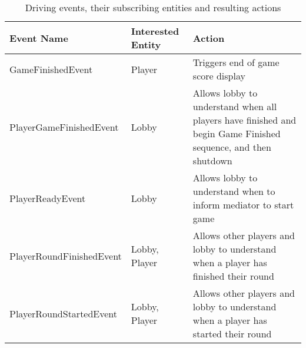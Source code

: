 \begin{table}[H]
	\centering
	\begin{tabular}{ | l | l | p{10cm} | }
		\hline
		Event Name & Interested Entity & Action  \\
		\hline
		\hline
		GameFinishedEvent & Player & Triggers end of game score display\\ 
		\hline
		PlayerGameFinishedEvent & Lobby & Allows lobby to understand when all players have finished and begin Game Finished sequence, and then shutdown \\
		\hline
		PlayerReadyEvent & Lobby & Allows lobby to understand when to inform mediator to start game \\
		\hline
		PlayerRoundFinishedEvent & Lobby, Player & Allows other players and lobby to understand when a player has finished their round \\
		\hline
		PlayerRoundStartedEvent & Lobby, Player & Allows other players and lobby to understand when a player has started their round \\
		\hline
	\end{tabular}
	\caption{Driving events, their subscribing entities and resulting actions}
	\label{tab:eventsEntitiesAndActions}
\end{table}